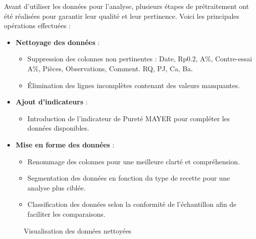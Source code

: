 \documentclass[12pt]{article}
\begin{document}
\newpage

Avant d'utiliser les données pour l'analyse, plusieurs étapes de 
prétraitement ont été réalisées pour garantir leur qualité et leur 
pertinence. Voici les principales opérations effectuées :

\begin{itemize}
    \item \textbf{Nettoyage des données} :
    \begin{itemize}
        \item Suppression des colonnes non pertinentes : Date, Rp0.2, A\%, Contre-essai A\%, Pièces, Observations, Comment. RQ, PJ, Ca, Ba.
        \item Élimination des lignes incomplètes contenant des valeurs manquantes.
    \end{itemize}

    \vspace{0.5cm}

    
    \item \textbf{Ajout d'indicateurs} :
    \begin{itemize}
        \item Introduction de l'indicateur de Pureté MAYER pour compléter les données disponibles.
    \end{itemize}

    
    \vspace{0.5cm}
    
    \item \textbf{Mise en forme des données} :
    \begin{itemize}
        \item Renommage des colonnes pour une meilleure clarté et compréhension.
        \item Segmentation des données en fonction du type de recette pour une analyse plus ciblée.
        \item Classification des données selon la conformité de l'échantillon afin de faciliter les comparaisons.
    \end{itemize}
\end{itemize}

    


\begin{figure}[H]
    \centering
    \caption{Visualisation des données nettoyées}
    \label{fig:donnees_nettoyees}
\end{figure}
\end{document}
